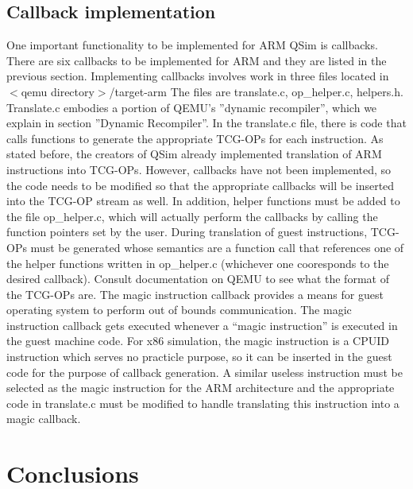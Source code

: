 \documentclass[letterpaper,10pt,twocolumn]{article}
\begin{document}
\subsection{Callback implementation}
One important functionality to be implemented for ARM QSim is callbacks. There are six callbacks to be implemented for ARM and they are listed in the previous section. Implementing callbacks involves work in three files located in
$<$qemu directory$>$/target-arm The files are translate.c, op\_helper.c, helpers.h. Translate.c embodies a portion of QEMU’s ''dynamic recompiler'', which we explain in section ''Dynamic Recompiler''. In the translate.c file, there is code that calls functions to generate the appropriate TCG-OPs for each instruction. As stated before, the creators of QSim already implemented translation of ARM instructions into TCG-OPs. However, callbacks have not been implemented, so the code needs to be modified so that the appropriate callbacks will be inserted into the TCG-OP stream as well. In addition, helper functions must be added to the file op\_helper.c, which will actually perform the callbacks by calling the  function pointers set by the user. During translation of guest instructions, TCG-OPs must be generated whose semantics are a function call that references one of the helper functions written in op\_helper.c (whichever one cooresponds to the desired callback). Consult documentation on QEMU to see what the format of the TCG-OPs are.
The magic instruction callback provides a means for guest operating system to perform out of bounds communication. The magic instruction callback gets executed whenever a “magic instruction” is executed in the guest machine code. For x86 simulation, the magic instruction is a CPUID instruction which serves no practicle purpose, so it can be inserted in the guest code for the purpose of callback generation. A similar useless instruction must be selected as the magic instruction for the ARM architecture and the appropriate code in translate.c must be modified to handle translating this instruction into a magic callback.
\section{Conclusions}
\end{document}
